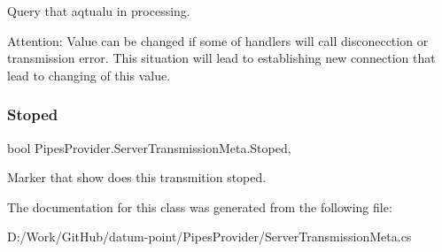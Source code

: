 Query that aqtualu in processing. 

Attention\+: Value can be changed if some of handlers will call disconecction or transmission error. This situation will lead to establishing new connection that lead to changing of this value. \mbox{\label{class_pipes_provider_1_1_server_transmission_meta_a9b501faba9c2cb9ed8873f1935d95b7c}} 
\subsubsection{\texorpdfstring{Stoped}{Stoped}}
{\footnotesize\ttfamily bool Pipes\+Provider.\+Server\+Transmission\+Meta.\+Stoped\hspace{0.3cm}{\ttfamily [get]}, {}}



Marker that show does this transmition stoped. 



The documentation for this class was generated from the following file\+:\begin{DoxyCompactItemize}
\item 
D\+:/\+Work/\+Git\+Hub/datum-\/point/\+Pipes\+Provider/Server\+Transmission\+Meta.\+cs\end{DoxyCompactItemize}
